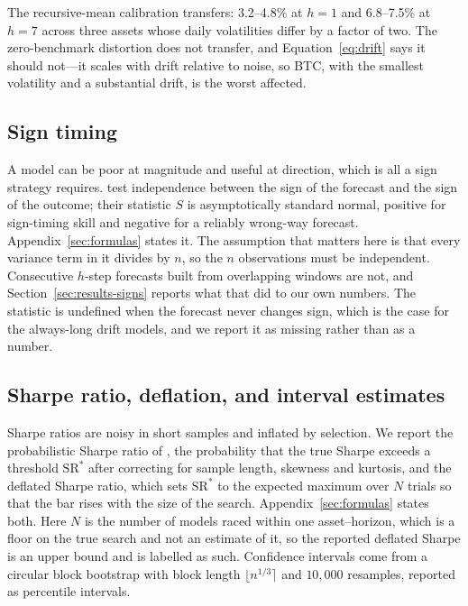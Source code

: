 \documentclass{article}
\theoremstyle{plain}
\theoremstyle{definition}
\begin{document}
The recursive-mean calibration transfers: 3.2--4.8\% at $h=1$ and 6.8--7.5\% at $h=7$ across
three assets whose daily volatilities differ by a factor of two. The zero-benchmark distortion
does not transfer, and Equation~\eqref{eq:drift} says it should not---it scales with drift
relative to noise, so BTC, with the smallest volatility and a substantial drift, is the worst
affected.

\subsection{Sign timing}
\label{sec:sign}

A model can be poor at magnitude and useful at direction, which is all a sign
strategy requires. \citet{pesaran1992} test independence between the sign of the
forecast and the sign of the outcome; their statistic $S$ is asymptotically
standard normal, positive for sign-timing skill and negative for a reliably
wrong-way forecast. Appendix~\ref{sec:formulas} states it. The assumption that
matters here is that every variance term in it divides by $n$, so the $n$
observations must be independent. Consecutive $h$-step forecasts built from
overlapping windows are not, and Section~\ref{sec:results-signs} reports what that
did to our own numbers. The statistic is undefined when the forecast never changes
sign, which is the case for the always-long drift models, and we report it as
missing rather than as a number.

\subsection{Sharpe ratio, deflation, and interval estimates}

Sharpe ratios are noisy in short samples \citep{lo2002} and inflated by selection.
We report the probabilistic Sharpe ratio of \citet{bailey2014}, the probability
that the true Sharpe exceeds a threshold $\mathrm{SR}^{\ast}$ after correcting for
sample length, skewness and kurtosis, and the deflated Sharpe ratio, which sets
$\mathrm{SR}^{\ast}$ to the expected maximum over $N$ trials so that the bar rises
with the size of the search. Appendix~\ref{sec:formulas} states both. Here $N$ is
the number of models raced within one asset--horizon, which is a floor on the true
search and not an estimate of it, so the reported deflated Sharpe is an upper bound
and is labelled as such. Confidence intervals come from a circular block bootstrap
\citep{politis1994} with block length $\lfloor n^{1/3} \rceil$ and $10{,}000$ resamples,
reported as percentile intervals.
\end{document}
